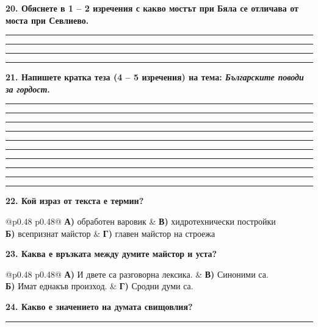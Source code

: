\documentclass[12pt,a4paper]{article}
\begin{document}
\vspace{0.6cm}

\noindent
\textbf{20. Обяснете в 1 – 2 изречения с какво мостът при Бяла се отличава от моста при Севлиево.}

\vspace{0.2cm}
\noindent\rule{\linewidth}{0.4pt}
\noindent\rule{\linewidth}{0.4pt}
\noindent\rule{\linewidth}{0.4pt}
\noindent\rule{\linewidth}{0.4pt}

\vspace{0.6cm}

\noindent
\textbf{21. Напишете кратка теза (4 – 5 изречения) на тема: \textit{Българските поводи за гордост}.}

\vspace{0.2cm}
\noindent\rule{\linewidth}{0.4pt}
\noindent\rule{\linewidth}{0.4pt}
\noindent\rule{\linewidth}{0.4pt}
\noindent\rule{\linewidth}{0.4pt}
\noindent\rule{\linewidth}{0.4pt}
\noindent\rule{\linewidth}{0.4pt}
\noindent\rule{\linewidth}{0.4pt}
\noindent\rule{\linewidth}{0.4pt}
\noindent\rule{\linewidth}{0.4pt}
\noindent\rule{\linewidth}{0.4pt}

\vspace{0.6cm}

\noindent
\textbf{22. Кой израз от текста е термин?} \\
\begin{tabular}{@{}p{0.48\textwidth} p{0.48\textwidth}@{}}
\textbf{А)} обработен варовик & \textbf{В)} хидротехнически постройки \\
\textbf{Б)} всепризнат майстор & \textbf{Г)} главен майстор на строежа
\end{tabular}

\vspace{0.6cm}

\noindent
\textbf{23. Каква е връзката между думите майстор и уста?} \\
\begin{tabular}{@{}p{0.48\textwidth} p{0.48\textwidth}@{}}
\textbf{А)} И двете са разговорна лексика. & \textbf{В)} Синоними са. \\
\textbf{Б)} Имат еднакъв произход. & \textbf{Г)} Сродни думи са.
\end{tabular}

\vspace{0.6cm}

\noindent
\textbf{24. Какво е значението на думата свищовлия?}

\vspace{0.2cm}
\noindent\rule{\linewidth}{0.4pt}
\end{document}
